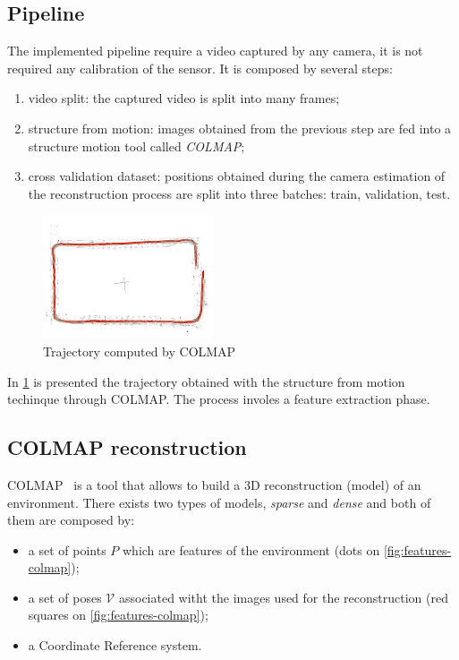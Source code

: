 \subsection{Pipeline}
The implemented pipeline require a video captured by any camera, it is not required any calibration of the sensor. It is composed by several steps:
\begin{enumerate}
    \item video split: the captured video is split into many frames; 
    \item structure from motion: images obtained from the previous step are fed into a structure motion tool called \emph{COLMAP};
    \item cross validation dataset: positions obtained during the camera estimation of the reconstruction process are split into three batches: train, validation, test.
\end{enumerate}

\begin{figure}[h]
    \begin{center}
        \includegraphics[width=0.45\textwidth]{./imgs/trajectory_colmap.png}
    \end{center}
    \caption{Trajectory computed by COLMAP}
    \label{fig:trajectory-colmap}
\end{figure}

In \cref{fig:trajectory-colmap} is presented the trajectory obtained with the structure from motion techinque through COLMAP. The process involes a feature extraction phase.

\subsection{COLMAP reconstruction}
COLMAP~\cite{colmap} is a tool that allows to build a 3D reconstruction (model) of an environment. There exists two types of models, \textit{sparse} and \textit{dense} and both of them are composed by:
\begin{itemize}
    \item a set of points $P$ which are features of the environment (dots on \cref{fig:features-colmap});
    \item a set of poses $\mathcal{V}$ associated witht the images used for the reconstruction (red squares on \cref{fig:features-colmap});
    \item a Coordinate Reference system.
\end{itemize}

